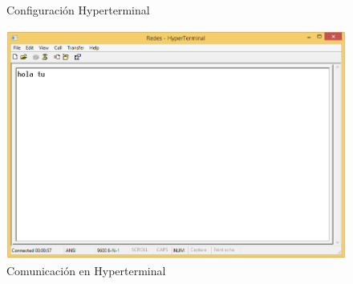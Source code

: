 \documentclass[a4paper,12pt]{article}
\begin{document}
\begin{enumerate}
\begin{figure}[H]
  \caption{Configuración Hyperterminal}
 \end{figure}
 \begin{figure}[H]
  \centering
  \includegraphics[scale = 0.5]{6.png}
  \caption{Comunicación en Hyperterminal}
 \end{figure}


\end{enumerate}
\end{document}
